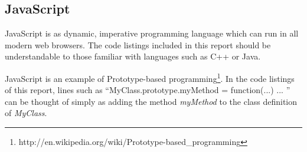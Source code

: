 \subsection{JavaScript}
JavaScript is as dynamic, imperative programming language which can run in all modern web browsers. The code listings included in this report should be understandable to those familiar with languages such as C++ or Java.

JavaScript is an example of Prototype-based programming\footnote{http://en.wikipedia.org/wiki/Prototype-based\_programming}. In the code listings of this report, lines such as ``MyClass.prototype.myMethod = function(...) { ... }'' can be thought of simply as adding the method \textit{myMethod} to the class definition of \textit{MyClass}.